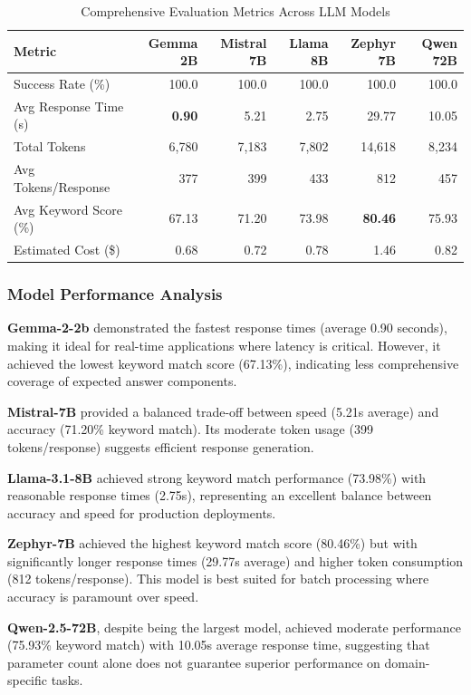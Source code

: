 \documentclass[11pt, a4paper]{article}
\begin{document}
\begin{table}[H]
\centering
\caption{Comprehensive Evaluation Metrics Across LLM Models}
\label{tab:evaluation_metrics}
\begin{tabular}{@{}lrrrrr@{}}
\toprule
\textbf{Metric} & \textbf{Gemma 2B} & \textbf{Mistral 7B} & \textbf{Llama 8B} & \textbf{Zephyr 7B} & \textbf{Qwen 72B} \\
\midrule
Success Rate (\%) & 100.0 & 100.0 & 100.0 & 100.0 & 100.0 \\
Avg Response Time (s) & \textbf{0.90} & 5.21 & 2.75 & 29.77 & 10.05 \\
Total Tokens & 6,780 & 7,183 & 7,802 & 14,618 & 8,234 \\
Avg Tokens/Response & 377 & 399 & 433 & 812 & 457 \\
Avg Keyword Score (\%) & 67.13 & 71.20 & 73.98 & \textbf{80.46} & 75.93 \\
Estimated Cost (\$) & 0.68 & 0.72 & 0.78 & 1.46 & 0.82 \\
\bottomrule
\end{tabular}
\end{table}

\subsubsection{Model Performance Analysis}

\textbf{Gemma-2-2b} demonstrated the fastest response times (average 0.90 seconds), making it ideal for real-time applications where latency is critical. However, it achieved the lowest keyword match score (67.13\%), indicating less comprehensive coverage of expected answer components.

\textbf{Mistral-7B} provided a balanced trade-off between speed (5.21s average) and accuracy (71.20\% keyword match). Its moderate token usage (399 tokens/response) suggests efficient response generation.

\textbf{Llama-3.1-8B} achieved strong keyword match performance (73.98\%) with reasonable response times (2.75s), representing an excellent balance between accuracy and speed for production deployments.

\textbf{Zephyr-7B} achieved the highest keyword match score (80.46\%) but with significantly longer response times (29.77s average) and higher token consumption (812 tokens/response). This model is best suited for batch processing where accuracy is paramount over speed.

\textbf{Qwen-2.5-72B}, despite being the largest model, achieved moderate performance (75.93\% keyword match) with 10.05s average response time, suggesting that parameter count alone does not guarantee superior performance on domain-specific tasks.
\end{document}
